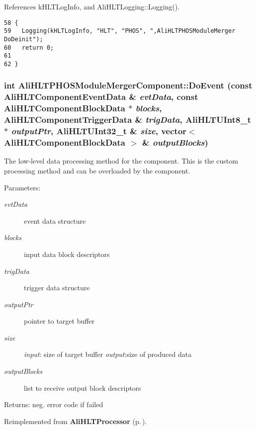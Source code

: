 References k\-HLTLog\-Info, and Ali\-HLTLogging::Logging().

\footnotesize\begin{verbatim}58 {
59   Logging(kHLTLogInfo, "HLT", "PHOS", ",AliHLTPHOSModuleMerger DoDeinit");
60   return 0;
61 
62 }
\end{verbatim}\normalsize 


\subsubsection{\setlength{\rightskip}{0pt plus 5cm}int Ali\-HLTPHOSModule\-Merger\-Component::Do\-Event (const {\bf Ali\-HLTComponent\-Event\-Data} \& {\em evt\-Data}, const {\bf Ali\-HLTComponent\-Block\-Data} $\ast$ {\em blocks}, {\bf Ali\-HLTComponent\-Trigger\-Data} \& {\em trig\-Data}, {\bf Ali\-HLTUInt8\_\-t} $\ast$ {\em output\-Ptr}, {\bf Ali\-HLTUInt32\_\-t} \& {\em size}, vector$<$ {\bf Ali\-HLTComponent\-Block\-Data} $>$ \& {\em output\-Blocks})\hspace{0.3cm}{\tt  [virtual]}}\label{classAliHLTPHOSModuleMergerComponent_a7}


The low-level data processing method for the component. This is the custom processing method and can be overloaded by the component. \begin{Desc}
\item[Parameters:]
\begin{description}
\item[{\em evt\-Data}]event data structure \item[{\em blocks}]input data block descriptors \item[{\em trig\-Data}]trigger data structure \item[{\em output\-Ptr}]pointer to target buffer \item[{\em size}]{\em input\/}: size of target buffer {\em output\/}:size of produced data \item[{\em output\-Blocks}]list to receive output block descriptors \end{description}
\end{Desc}
\begin{Desc}
\item[Returns:]neg. error code if failed \end{Desc}


Reimplemented from {\bf Ali\-HLTProcessor} {\rm (p.\,\pageref{classAliHLTProcessor_d0})}.

